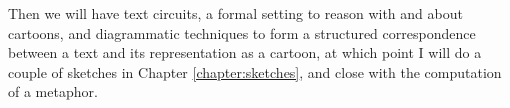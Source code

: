 Then we will have text circuits, a formal setting to reason with and about cartoons, and diagrammatic techniques to form a structured correspondence between a text and its representation as a cartoon, at which point I will do a couple of sketches in Chapter \ref{chapter:sketches}, and close with the computation of a metaphor.
